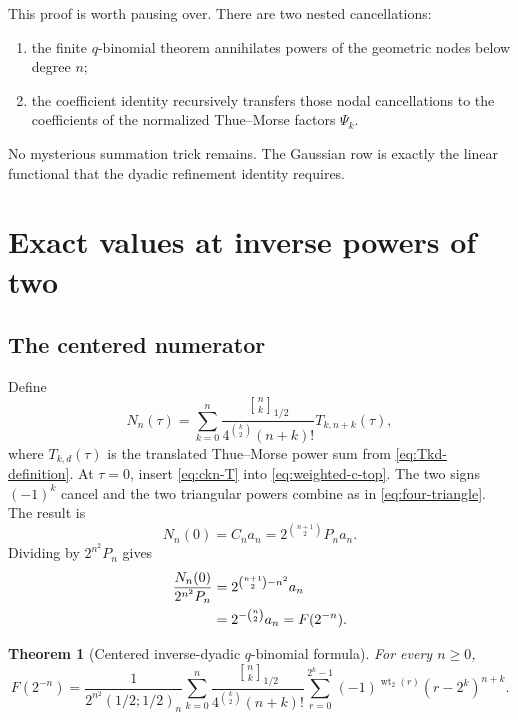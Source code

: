 \documentclass[11pt]{article}
\newtheorem{theorem}{Theorem}[section]
\theoremstyle{definition}
\newcommand{\Fabius}{F}
\newcommand{\wt}{\operatorname{wt}_2}
\newcommand{\qpoch}[3]{\left(#1;#2\right)_{#3}}
\newcommand{\Qbin}[3]{\genfrac{[}{]}{0pt}{}{#1}{#2}_{#3}}
\begin{document}
This proof is worth pausing over.  There are two nested cancellations:
\begin{enumerate}[leftmargin=2.2em]
  \item the finite $q$-binomial theorem annihilates powers of the geometric nodes below degree $n$;
  \item the coefficient identity recursively transfers those nodal cancellations to the coefficients of the normalized Thue--Morse factors $\Psi_k$.
\end{enumerate}
No mysterious summation trick remains.  The Gaussian row is exactly the linear functional that the dyadic refinement identity requires.

\section{Exact values at inverse powers of two}
\label{sec:inverse-dyadic-formula}

\subsection{The centered numerator}

Define
\begin{equation}
  N_n(\tau)
  =\sum_{k=0}^{n}
    \frac{\Qbin{n}{k}{1/2}}
         {4^{\binom{k}{2}}(n+k)!}
    T_{k,n+k}(\tau),
  \label{eq:Nn-tau}
\end{equation}
where $T_{k,d}(\tau)$ is the translated Thue--Morse power sum from
\cref{eq:Tkd-definition}.  At $\tau=0$, insert \cref{eq:ckn-T} into
\cref{eq:weighted-c-top}.  The two signs $(-1)^k$ cancel and the two triangular powers combine as in \cref{eq:four-triangle}.  The result is
\begin{equation}
  N_n(0)=C_na_n
  =2^{\binom{n+1}{2}}P_na_n.
  \label{eq:Nn-value}
\end{equation}
Dividing by $2^{n^2}P_n$ gives
\begin{align}
  \frac{N_n(0)}{2^{n^2}P_n}
  &=2^{\binom{n+1}{2}-n^2}a_n\notag\\
  &=2^{-\binom{n}{2}}a_n
  =\Fabius(2^{-n}).
  \label{eq:normalization-computation}
\end{align}

\begin{theorem}[Centered inverse-dyadic $q$-binomial formula]
For every $n\ge0$,
\begin{equation}
\boxed{
  \Fabius(2^{-n})
  =\frac{1}{2^{n^2}\qpoch{1/2}{1/2}{n}}
    \sum_{k=0}^{n}
    \frac{\Qbin{n}{k}{1/2}}
         {4^{\binom{k}{2}}(n+k)!}
    \sum_{r=0}^{2^k-1}
      (-1)^{\wt(r)}(r-2^k)^{n+k}.}
  \label{eq:centered-inverse-dyadic}
\end{equation}
\end{theorem}
\end{document}
